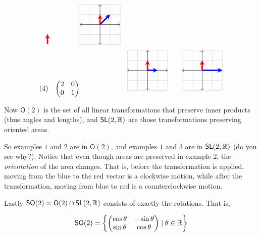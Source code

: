 \documentclass[../main.tex]{subfiles}
\begin{document}
\begin{align*}
\begin{tikzpicture}[scale=0.5]
  \draw[line width=2pt,red,-stealth](0,0)--(0,1);
\end{tikzpicture}
  &&&
\begin{tikzpicture}[scale=0.5]
  \draw[thin,gray!40] (-2,-2) grid (2,2);
  \draw[<->] (-2,0)--(2,0);
  \draw[<->] (0,-2)--(0,2);
  \draw[line width=2pt,blue,-stealth](0,0)--(1,1);
  \draw[line width=2pt,red,-stealth](0,0)--(0,1);
\end{tikzpicture} \\
  (4) &&
\begin{pmatrix}
  2 & 0 \\ 0 & 1
\end{pmatrix}
  &&&
\begin{tikzpicture}[scale=0.5]
  \draw[thin,gray!40] (-2,-2) grid (2,2);
  \draw[<->] (-2,0)--(2,0);
  \draw[<->] (0,-2)--(0,2);
  \draw[line width=2pt,blue,-stealth](0,0)--(1,0);
  \draw[line width=2pt,red,-stealth](0,0)--(0,1);
\end{tikzpicture}
  &&&
\begin{tikzpicture}[scale=0.5]
  \draw[thin,gray!40] (-2,-2) grid (2,2);
  \draw[<->] (-2,0)--(2,0);
  \draw[<->] (0,-2)--(0,2);
  \draw[line width=2pt,blue,-stealth](0,0)--(2,0);
  \draw[line width=2pt,red,-stealth](0,0)--(0,1);
\end{tikzpicture} 
\end{align*}

Now $\mathsf{O}(2)$ is the set of all linear transformations
that preserve inner products (thus angles and lengths), and
$\mathsf{SL}(2,\mathbb{R})$ are those transformations preserving oriented areas.

So examples $1$ and $2$ are in $\mathsf{O}(2)$, and examples $1$ and $3$ are 
in $\mathsf{SL}(2,\mathbb{R})$ (do you see why?). Notice that even though areas are 
preserved in example $2$, the \emph{orientation} of the area changes. That is,
before the transformation is applied, moving from the blue to the red vector
is a clockwise motion, while after the transformation, moving from blue to red
is a counterclockwise motion.


Lastly $\mathsf{SO}(2) = \mathsf{O}(2) \cap \mathsf{SL}(2,\mathbb{R})$ consists of exactly
the rotations. That is,

\[ 
  \mathsf{SO}(2) = 
  \left \{ 
    \begin{pmatrix} 
      \cos \theta & - \sin \theta \\ \sin \theta & \cos \theta 
    \end{pmatrix}
  \mid
    \theta \in \mathbb{R}
  \right \}
\]
\end{document}
